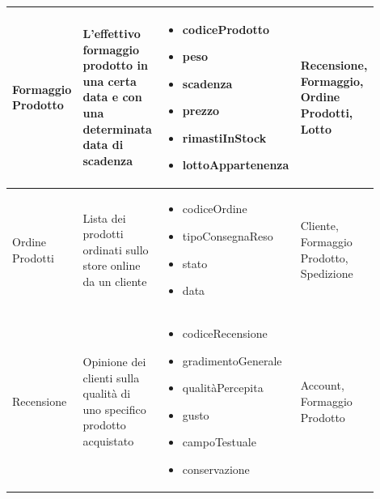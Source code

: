 \documentclass[12pt,a4paper]{article}
\begin{document}
\begin{center}
\begin{longtable}{|p{0.14\linewidth}|p{0.20\linewidth}|p{0.36\linewidth}|p{0.20\linewidth}|}
\hline
Formaggio Prodotto 	&  L'effettivo formaggio prodotto in una certa data e con una determinata data di scadenza  
					& \begin{itemize}
						\setlength{\itemindent}{-1em}
						\vspace{-25pt}
						\setlength\itemsep{-0.25em}
						\item codiceProdotto
						\item peso
						\item scadenza
						\item prezzo
						\item rimastiInStock
						\item lottoAppartenenza
						
					\end{itemize}
					&  Recensione, Formaggio, Ordine Prodotti, Lotto  \\ 

\hline
Ordine Prodotti 		&  Lista dei prodotti ordinati sullo store online da un cliente  
					& \begin{itemize}
						\setlength{\itemindent}{-1em}
						\vspace{-25pt}
						\setlength\itemsep{-0.25em}
						\item codiceOrdine
						\item tipoConsegnaReso
						\item stato
						\item data
						
						
						
					\end{itemize}
					&  Cliente, Formaggio Prodotto, Spedizione  \\ 

\hline
Recensione 			&  Opinione dei clienti sulla qualità di uno specifico prodotto acquistato  
					& \begin{itemize}
						\setlength{\itemindent}{-1em}
						\vspace{-25pt}
						\setlength\itemsep{-0.25em}
						\item codiceRecensione
						\item gradimentoGenerale
						\item qualitàPercepita
						\item gusto
						\item campoTestuale
						\item conservazione
						
						
						
					\end{itemize}
					&  Account, Formaggio Prodotto  \\ 


\end{longtable}
\end{center}
\end{document}
